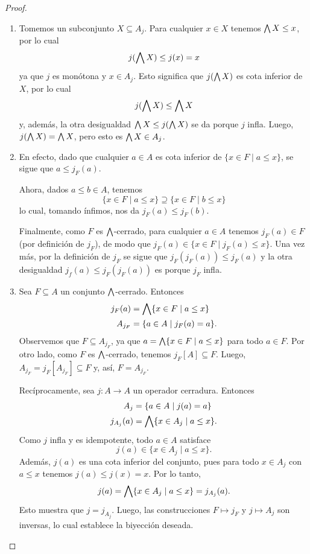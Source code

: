 \begin{proof}
  \begin{enumerate}
    \item
    Tomemos un subconjunto $X\subseteq A_j$.
    Para cualquier $x\in X$ tenemos $\bigwedge X\leq x$, por lo cual
    \[
        j(\bigwedge X) \leq j(x) = x
    \]
    ya que $j$ es monótona y $x\in A_j$.
    Esto significa que $j(\bigwedge X)$ es cota inferior de $X$, por
    lo cual
    \[
        j(\bigwedge X)\leq \bigwedge X
    \]
    y, además, la otra desigualdad $\bigwedge X\leq j(\bigwedge X)$ se da
    porque $j$ infla.
    Luego, $j(\bigwedge X) = \bigwedge X$, pero esto es $\bigwedge X \in A_j$.
    \item
    En efecto, dado que cualquier $a\in A$ es cota inferior de
    $\{x\in F \mid a\leq x\}$, se sigue que $a\leq j_F(a)$.

    Ahora, dados $a\leq b\in A$, tenemos
    \[
        \{x\in F \mid a\leq x\} \supseteq \{x\in F \mid b\leq x\}
    \]
    lo cual, tomando ínfimos, nos da $j_F(a) \leq j_F(b)$.

    Finalmente, como $F$ es $\bigwedge$-cerrado, para cualquier $a\in A$
    tenemos $j_F(a)\in F$ (por definición de $j_F$),
    de modo que $j_F(a) \in\{x\in F \mid j_F(a) \leq x\}$.
    Una vez más, por la definición de $j_F$ se sigue que
    $j_F(j_F(a)) \leq j_F(a)$
    y la otra desigualdad $j_f(a)\leq j_F(j_F(a))$ es porque
    $j_F$ infla.
    \item
    Sea $F\subseteq A$ un conjunto $\bigwedge$-cerrado.
    Entonces
    \begin{align*}
        j_F(a) &= \bigwedge\{x\in F \mid a\leq x\} \\
        A_{j_F} &= \{a\in A \mid j_F(a)=a\}.
    \end{align*}
    Observemos que $F\subseteq A_{j_F}$, ya que
    $a=\bigwedge\{x\in F\mid a\leq x\}$ para todo $a\in F$.
    Por otro lado,
    como $F$ es $\bigwedge$-cerrado, tenemos $j_F[A]\subseteq F$.
    Luego, $A_{j_F}=j_F[A_{j_F}] \subseteq F$ y, así, $F=A_{j_F}$.
    
    Recíprocamente, sea $j:A\to A$ un operador cerradura.
    Entonces
    \begin{align*}
        A_j &= \{a\in A \mid j(a)=a \} \\
        j_{A_j}(a) &= \bigwedge\{x\in A_j \mid a\leq x\}.
    \end{align*}
    Como $j$ infla y es idempotente, todo $a\in A$ satisface
    \[
        j(a) \in \{x\in A_j \mid a\leq x\}
    .\]
    Además, $j(a)$ es una cota inferior del conjunto,
    pues para todo
    $x\in A_j$ con $a\leq x$ tenemos $j(a)\leq j(x)=x$.
    Por lo tanto,
    \[
        j(a) = \bigwedge\{x\in A_j \mid a\leq x\} = j_{A_j}(a)
    .\]
    Esto muestra que $j=j_{A_j}$.
    Luego, las construcciones $F\mapsto j_F$ y $j\mapsto A_j$
    son inversas, lo cual establece la biyección deseada.
  \end{enumerate}
\end{proof}

